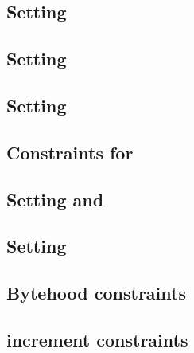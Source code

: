 \subsection{Setting \indexMax{}                            \lispTodo{}}    \label{bls: generalities: setting index max}                  
\subsection{Setting \blsIndex{}                            \lispTodo{}}    \label{bls: generalities: setting index}                      
\subsection{Setting           \maxCt{}                     \lispTodo{}}    \label{bls: generalities: setting ct_max}                     
\subsection{Constraints for \ct{}                          \lispTodo{}}    \label{bls: generalities: setting ct}                         
\subsection{Setting \isFirstInput{} and \isSecondInput{}   \lispTodo{}}    \label{bls: generalities: setting is_first and is_second}     
\subsection{Setting \accInputs{}                           \lispTodo{}}    \label{bls: generalities: setting acc pairings}               
\subsection{Bytehood constraints                           \lispTodo{}}    \label{bls: generalities: bytehood and accumulator}           
\subsection{\blsId{} increment constraints                 \lispTodo{}}    \label{bls: generalities: stamp increments}                   
